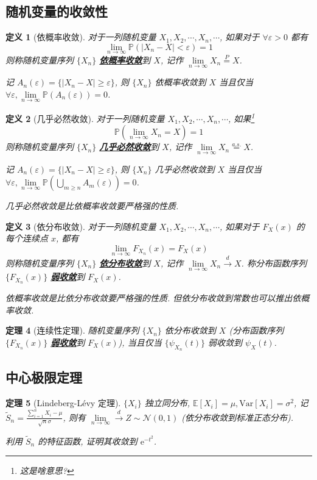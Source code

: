 \documentclass[8pt]{article}
\theoremstyle{compact}
\newtheorem{theorem}{定理}
\newtheorem{definition}[theorem]{定义}
\def\obj#1{\textbf{\uline{#1}}}
\def\ge{\geqslant}
\def\P#1{\mathbb{P}\left({#1}\right)}
\def\e{\mathrm{e}}
\def\E#1{\mathbb{E}\left[{#1}\right]}
\def\Var#1{\text{Var}\left[{#1}\right]}
\begin{document}
\subsection{随机变量的收敛性}
\begin{definition}[依概率收敛]
	对于一列随机变量 $X_1, X_2, \cdots, X_n, \cdots$, 如果对于 $\forall \varepsilon > 0$ 都有
	$$\lim\limits_{n \to \infty} \P{|X_n - X| < \varepsilon} = 1$$
	则称随机变量序列 $\{X_n\}$ \obj{依概率收敛}到 $X$, 记作 $\lim\limits_{n \to \infty} X_n \overset{P}{=} X$.
	
	记 $A_n(\varepsilon) = \{|X_n - X| \ge \varepsilon\}$, 则 $\{X_n\}$ 依概率收敛到 $X$ 当且仅当 $\forall \varepsilon, \lim\limits_{n \to \infty}\P{A_n(\varepsilon)} = 0$.
			
\end{definition}
\begin{definition}[几乎必然收敛]
对于一列随机变量 $X_1, X_2, \cdots, X_n, \cdots$, 如果\footnote{这是啥意思?}
$$\P{\lim\limits_{n \to \infty}X_n = X} = 1$$
则称随机变量序列 $\{X_n\}$ \obj{几乎必然收敛}到 $X$, 记作 $\lim\limits_{n \to \infty} X_n \overset{a.s.}{=} X$.

记 $A_n(\varepsilon) = \{|X_n - X| \ge \varepsilon\}$, 则 $\{X_n\}$ 几乎必然收敛到 $X$ 当且仅当 $\forall \varepsilon, \lim\limits_{n \to \infty}\P{\bigcup_{m\ge n}A_m(\varepsilon)} = 0$.

几乎必然收敛是比依概率收敛要严格强的性质.
\end{definition}
\begin{definition}[依分布收敛]
对于一列随机变量 $X_1, X_2, \cdots, X_n, \cdots$, 如果对于 $F_X(x)$ 的每个连续点 $x$, 都有
$$\lim\limits_{n \to \infty}F_{X_n}(x) = F_X(x)$$
则称随机变量序列 $\{X_n\}$ \obj{依分布收敛}到 $X$, 记作 $\lim\limits_{n \to \infty}X_n \overset{d}{\to} X$. 称分布函数序列 $\{F_{X_n}(x)\}$ \obj{弱收敛}到 $F_X(x)$.

依概率收敛是比依分布收敛要严格强的性质. 但依分布收敛到常数也可以推出依概率收敛.
\end{definition}
\begin{theorem}[连续性定理]
	随机变量序列 $\{X_n\}$ 依分布收敛到 $X$ (分布函数序列 $\{F_{X_n}(x)\}$ \obj{弱收敛}到 $F_X(x)$), 当且仅当 $\{\psi_{X_n}(t)\}$ 弱收敛到 $\psi_X(t)$.
\end{theorem}

\subsection{中心极限定理}
\begin{theorem}[Lindeberg-L\'evy 定理]
	$\{X_i\}$ 独立同分布, $\E{X_i} = \mu, \Var{X_i} = \sigma^2$, 记 $\tilde{S}_n = \frac{\sum_{i=1}^nX_i - \mu}{\sqrt n \sigma}$, 则有 $\lim\limits_{n \to \infty}\overset{d}{\to} Z \sim \mathcal N(0, 1)$ (依分布收敛到标准正态分布).

	\textit{利用 $\tilde S_n$ 的特征函数, 证明其收敛到 $\e^{-t^2}$.}
\end{theorem}
\end{document}
